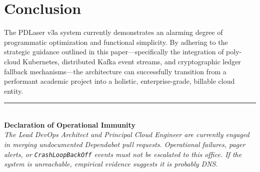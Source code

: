 \documentclass[12pt, a4paper]{article}
\begin{document}
\pagebreak

\section{Conclusion}
The PDLaser v3a system currently demonstrates an alarming degree of programmatic optimization and functional simplicity. By adhering to the strategic guidance outlined in this paper—specifically the integration of poly-cloud Kubernetes, distributed Kafka event streams, and cryptographic ledger fallback mechanisms—the architecture can successfully transition from a performant academic project into a holistic, enterprise-grade, billable cloud entity.

\vspace{3em}
\noindent\rule{0.4\textwidth}{0.4pt} \\
\textbf{Declaration of Operational Immunity} \\
\textit{The Lead DevOps Architect and Principal Cloud Engineer are currently engaged in merging undocumented Dependabot pull requests. Operational failures, pager alerts, or \texttt{CrashLoopBackOff} events must not be escalated to this office. If the system is unreachable, empirical evidence suggests it is probably DNS.}
\end{document}
